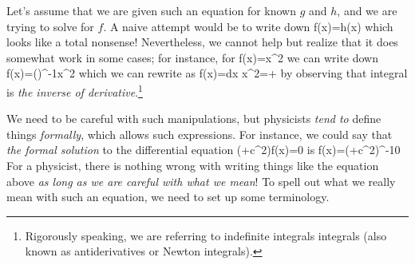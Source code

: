 Let's assume that we are given such an equation for known $g$ and $h$, and we are trying to solve for $f$. A naive attempt would be to write down
\be 
f(x)=h(x)
\ee 
which looks like a total nonsense! Nevertheless, we cannot help but realize that it does somewhat work in some cases; for instance, for
\be 
{}f(x)=x^2
\ee 
we can write down
\be 
f(x)=\left(\right)^{-1}x^2
\ee 
which we can rewrite as 
\be 
f(x)=\int dx x^2=+
\ee 
by observing that integral is \emph{the inverse of derivative}.\footnote{Rigorously speaking, we are referring to indefinite integrals integrals (also known as antiderivatives or Newton integrals).}

We need to be careful with such manipulations, but physicists \emph{tend to} define things \emph{formally}, which allows such expressions. For instance, we could say that \emph{the formal solution} to the differential equation
\be 
\left(+c^2\right)f(x)=0
\ee 
is
\be 
f(x)=\left(+c^2\right)^{-1}0
\ee 
For a physicist, there is nothing wrong with writing things like the equation above \emph{as long as we are careful with what we mean}! To spell out what we really mean with such an equation, we need to set up some terminology.


